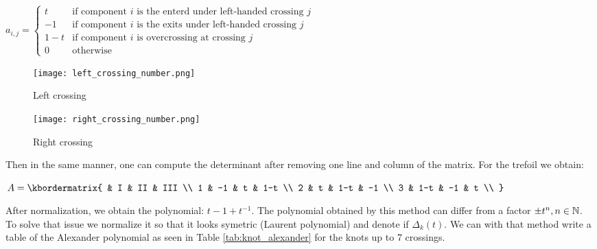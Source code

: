 \documentclass[12pt, a4paper]{article}
\begin{document}
\begin{center}
  $a_{i,j} =
  \begin{cases}
    t &\text{if component $i$ is the enterd under left-handed crossing $j$}\\
    -1 &\text{if component $i$ is the exits under left-handed crossing $j$}\\
    1-t &\text{if component $i$ is overcrossing at crossing $j$}\\
    0 &\text{otherwise}
  \end{cases}$
\end{center}

\begin{figure}[H]
  \begin{minipage}[c]{.50\textwidth}
  \centering
  \texttt{[image: left\_crossing\_number.png]}    
  \caption{Left crossing}
  \end{minipage}
  \hfill
  \begin{minipage}[c]{.50\textwidth}
  \centering
  \texttt{[image: right\_crossing\_number.png]}    
  \caption{Right crossing}
  \end{minipage}
  \label{fig:oriented_knot_alexander} 
\end{figure}

Then in the same manner, one can compute the determinant after removing one line and column of the matrix. For the trefoil we obtain:\\

\begin{center}
$
  A = \kbordermatrix{
    & I & II & III \\
    1 & -1 & t & 1-t  \\
    2 & t & 1-t & -1  \\
    3 & 1-t & -1 & t  \\
  }
$
\end{center}

After normalization, we obtain the polynomial: $t - 1 + t^{-1}$. The polynomial obtained by this method can differ from a factor $\pm t^n, n \in \mathbb{N}$. To solve that issue we normalize it so that it looks symetric (Laurent polynomial) and denote if $\Delta_k(t)$. We can with that method write a table of the Alexander polynomial as seen in Table \ref{tab:knot_alexander} for the knots up to 7 crossings.
\end{document}
